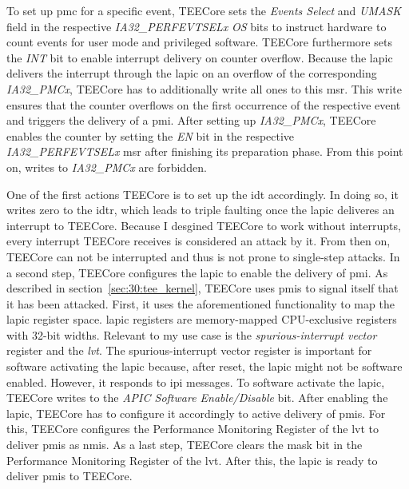 To set up \gls{pmc} for a specific event, TEECore sets the \textit{Events
Select} and \textit{UMASK} field in the respective \textit{IA32\_PERFEVTSELx}
\textit{OS} bits to instruct hardware to count events for user mode and
privileged software. TEECore furthermore sets the \textit{INT} bit to enable
interrupt delivery on counter overflow. Because the \gls{lapic} delivers the
interrupt through the \gls{lapic} on an overflow of the corresponding
\textit{IA32\_PMCx}, TEECore has to additionally write all ones to this
\gls{msr}. This write ensures that the counter overflows on the first
occurrence of the respective event and triggers the delivery of a \gls{pmi}.
After setting up \textit{IA32\_PMCx}, TEECore enables the counter by setting
the \textit{EN} bit in the respective \textit{IA32\_PERFEVTSELx} \gls{msr}
after finishing its preparation phase. From this point on, writes to
\textit{IA32\_PMCx} are forbidden.

One of the first actions TEECore is to set up the \gls{idt} accordingly. In
doing so, it writes zero to the \gls{idtr}, which leads to triple faulting once
the \gls{lapic} deliveres an interrupt to TEECore. Because I desgined TEECore to
work without interrupts, every interrupt TEECore receives is considered an
attack by it. From then on, TEECore can not be interrupted and thus is not prone
to single-step attacks. In a second step, TEECore configures the \gls{lapic} to
enable the delivery of \gls{pmi}. As described in
section~\ref{sec:30:tee_kernel}, TEECore uses \glspl{pmi} to signal itself that
it has been attacked. First, it uses the aforementioned functionality to map the
\gls{lapic} register space. \gls{lapic} registers are memory-mapped
CPU-exclusive registers with 32-bit widths. Relevant to my use case is the
\textit{spurious-interrupt vector} register and the \textit{\gls{lvt}}. The
spurious-interrupt vector register is important for software activating the
\gls{lapic} because, after reset, the \gls{lapic} might not be software enabled.
However, it responds to \gls{ipi} messages. To software activate the
\gls{lapic}, TEECore writes to the \textit{APIC Software Enable/Disable} bit.
After enabling the \gls{lapic}, TEECore has to configure it accordingly to
active delivery of \glspl{pmi}. For this, TEECore configures the Performance
Monitoring Register of the \gls{lvt} to deliver \glspl{pmi} as \glspl{nmi}. As a
last step, TEECore clears the mask bit in the Performance Monitoring Register of
the \gls{lvt}. After this, the \gls{lapic} is ready to deliver \glspl{pmi} to
TEECore.\\

